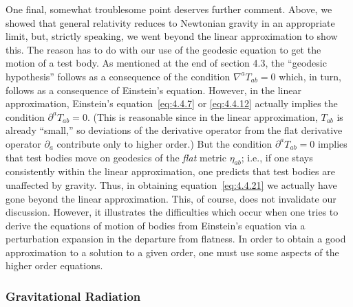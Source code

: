 One final, somewhat troublesome point deserves further comment. Above, we
showed that general relativity reduces to Newtonian gravity in an appropriate limit,
but, strictly speaking, we went beyond the linear approximation to show this. The
reason has to do with our use of the geodesic equation to get the motion of a test
body. As mentioned at the end of section 4.3, the ``geodesic hypothesis'' follows as
a consequence of the condition \(\nabla^aT_{ab}=0\) which, in turn, follows as a
consequence of Einstein's equation. However, in the linear approximation,
Einstein's equation~\eqref{eq:4.4.7} or \eqref{eq:4.4.12} actually implies the
condition \(\partial^aT_{ab}=0\). (This is reasonable since in the linear
approximation, \(T_{ab}\) is already ``small,'' so deviations of the derivative
operator from the flat derivative operator \(\partial_a\) contribute only to higher
order.) But the condition \(\partial^aT_{ab}=0\) implies that test bodies move on
geodesics of the \emph{flat} metric \(\eta_{ab}\); i.e., if one stays consistently
within the linear approximation, one predicts that test bodies are unaffected by
gravity. Thus, in obtaining equation~\eqref{eq:4.4.21} we actually have gone beyond
the linear approximation. This, of course, does not invalidate our discussion.
However, it illustrates the difficulties which occur when one tries to derive the
equations of motion of bodies from Einstein's equation via a perturbation expansion
in the departure from flatness. In order to obtain a good approximation to a
solution to a given order, one must use some aspects of the higher order equations.

\subsubsection*{Gravitational Radiation}


